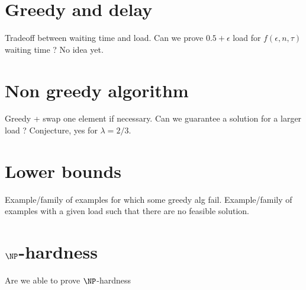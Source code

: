 \documentclass[10pt, conference, letterpaper]{IEEEtran}
\begin{document}
\section{Greedy and delay}

Tradeoff between waiting time and load. Can we prove $0.5 + \epsilon$ load for $f(\epsilon,n,\tau)$ waiting time ?  No idea yet.


\section{Non greedy algorithm}

Greedy + swap one element if necessary. 
Can we guarantee a solution for a larger load ? Conjecture, yes for $\lambda = 2/3$. 

\section{Lower bounds}

Example/family of examples for which some greedy alg fail.
Example/family of examples with a given load such that there are no feasible solution.

\section{$\NP$-hardness}

Are we able to prove $\NP$-hardness

% 
% 
\end{document}
